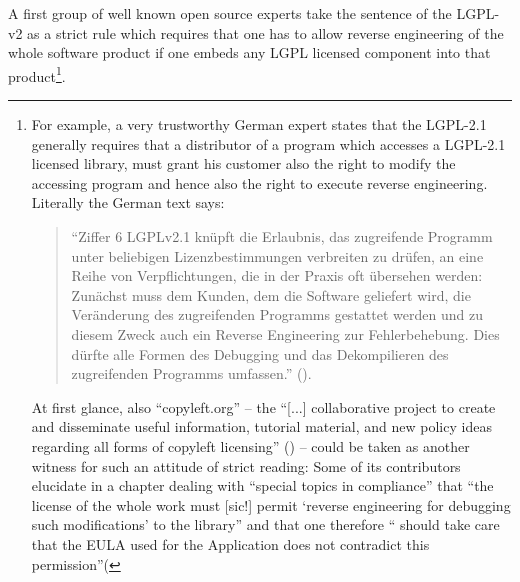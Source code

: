 A first group of well known open source experts take the sentence of the LGPL-v2
as a strict rule which requires that one has to allow reverse engineering of the
whole software product if one embeds any LGPL licensed component into that
product\footnote{For example, a very trustworthy German expert states that the
LGPL-2.1 generally requires that a distributor of a program which accesses a
LGPL-2.1 licensed library, must grant his customer also the right to modify the
accessing program and hence also the right to execute reverse engineering.
Literally the German text says:
\begin{quote}\enquote{Ziffer 6 LGPLv2.1 knüpft die Erlaubnis, das zugreifende
Programm unter beliebigen Lizenzbestimmungen verbreiten zu drüfen, an eine Reihe
von Verpflichtungen, die in der Praxis oft übersehen werden: Zunächst muss dem
Kunden, dem die Software geliefert wird, die Veränderung des zugreifenden
Programms gestattet werden und zu diesem Zweck auch ein Reverse Engineering zur
Fehlerbehebung. Dies dürfte alle Formen des Debugging und das Dekompilieren des
zugreifenden Programms umfassen.} (\cite[cf.][81]{JaeMet2011a}).\end{quote}
At first glance, also \enquote{copyleft.org} -- the \enquote{[...] collaborative
project to create and disseminate useful information, tutorial material, and new
policy ideas regarding all forms of copyleft licensing} (\cite[cf.][\nopage
wp.]{CopyLeftOrg2014a}) -- could be taken as another witness for such an
attitude of strict reading: Some of its contributors elucidate in a chapter
dealing with \enquote{special topics in compliance} that \enquote{the license of
the whole work must [sic!] permit \enquote{reverse engineering for debugging
such modifications} to the library} and that one therefore \enquote{ should take
care that the EULA used for the Application does not contradict this
permission}(\cite[cf.][86]{KuhSebGin2014a}}.

